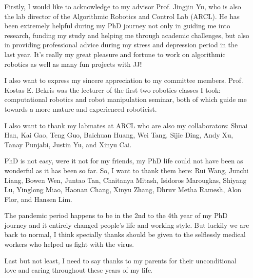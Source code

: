 
\begin{acknowledgments}
Firstly, I would like to acknowledge to my advisor Prof. Jingjin Yu, 
who is also the lab director of the Algorithmic Robotics and Control Lab (ARCL). 
He has been extremely helpful during my PhD journey 
not only in guiding me into research, funding my study and helping me through academic challenges, 
but also in providing professional advice during my stress and depression period in the last year. 
It's really my great pleasure and fortune to work on algorithmic robotics 
as well as many fun projects with JJ! 

I also want to express my sincere appreciation to my committee members. 
Prof. Kostas E. Bekris was the lecturer of the first two robotics classes I took: 
computational robotics and robot manipulation seminar, both of which guide me 
towards a more mature and experienced roboticist. 

I also want to thank my labmates at ARCL who are also my collaborators: Shuai Han, 
Kai Gao, Teng Guo, Baichuan Huang, Wei Tang, Sijie Ding, Andy Xu, Tanay Punjabi, 
Justin Yu, and Xinyu Cai. 

PhD is not easy, were it not for my friends, my PhD life 
could not have been as wonderful as it has been so far. 
So, I want to thank them here: Rui Wang, Junchi Liang, Bowen Wen, Juntao Tan, Chaitanya Mitash, 
Isidoros Marougkas, Shiyang Lu, Yinglong Miao, Haonan Chang, Xinyu Zhang, 
Dhruv Metha Ramesh, Alon Flor, and Hansen Lim. 

The pandemic period happens to be in the 2nd to the 4th year of my PhD journey and it entirely changed people's 
life and working style. But luckily we are back to normal, I think specially thanks should be given to the 
selflessly medical workers who helped us fight with the virus. 

Last but not least, I need to say thanks to my parents for their unconditional love 
and caring throughout these years of my life. 

\end{acknowledgments}
